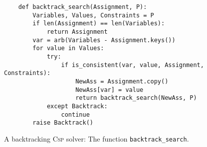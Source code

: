 \begin{figure}[!ht]
\centering
\begin{verbatim}
    def backtrack_search(Assignment, P):
        Variables, Values, Constraints = P
        if len(Assignment) == len(Variables):
            return Assignment
        var = arb(Variables - Assignment.keys())
        for value in Values:
            try:
                if is_consistent(var, value, Assignment, Constraints):
                    NewAss = Assignment.copy()
                    NewAss[var] = value
                    return backtrack_search(NewAss, P)
            except Backtrack:
                continue
        raise Backtrack()  
\end{verbatim}
\vspace*{-0.3cm}
\caption{A backtracking \textsc{Csp} solver: The function \texttt{backtrack\_search}.}
\label{fig:Backtrack-Solver.ipynb:backtrack_search}
\end{figure}

